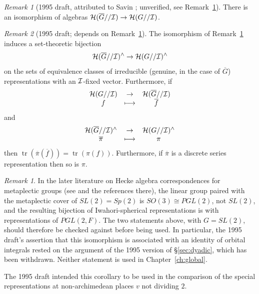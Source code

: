 \documentclass[12pt,letterpaper,openany]{book}
\theoremstyle{plain}
\theoremstyle{definition}
\theoremstyle{remark}
\newtheorem{remark}[theorem]{Remark}
\theoremstyle{remark}
\newtheorem{remyy}{Remark}
\newcommand{\tr}{\operatorname{tr}}
\begin{document}
\begin{remyy}[1995 draft, attributed to Savin \cite{Sav}; unverified, see
Remark~\ref{rem:savin-caveat}]\label{claim:savin} There is an isomorphism
of algebras
${\cal H}(\overline{G}//{\cal I})\rightarrow {\cal H}(G//{\cal I})$.
\end{remyy}

\begin{remyy}[1995 draft; depends on Remark~\ref{claim:savin}]
The isomorphism of Remark~\ref{claim:savin}
induces a set-theoretic bijection
\[
{\cal H}(\overline{G}//{\cal I})^\wedge\rightarrow {\cal H}(G//{\cal I})^\wedge
\]
on the sets of equivalence
classes of irreducible (genuine, in the case of $\overline{G}$)
representations with an ${\cal I}$-fixed vector.
Furthermore, if
\[
\begin{array}{ccc}
{\cal H}(G//{\cal I})&\rightarrow &{\cal H}(\overline{G}//{\cal I})\\
f & \longmapsto & \overline{f}
\end{array}
\]
and
\[
\begin{array}{ccc}
{\cal H}(\overline{G}//{\cal I})^\wedge &\rightarrow &{\cal H}(G//{\cal I})^\wedge\\
\overline{\pi}&\longmapsto &\pi
\end{array}
\]
then $\tr(\overline{\pi}(\overline{f}))=\tr(\pi(f))$.
Furthermore, if $\overline{\pi}$ is a discrete series representation
then so is $\pi$.
\end{remyy}

\begin{remark}\label{rem:savin-caveat}
In the later literature on Hecke algebra correspondences
for metaplectic groups (see \cite{TW} and the references there), the
linear group paired with the metaplectic cover of $SL(2)=Sp(2)$ is
$SO(3)\cong PGL(2)$, not $SL(2)$, and the resulting bijection of
Iwahori-spherical representations is with representations of $PGL(2,F)$.
The two statements above, with $G=SL(2)$, should therefore be
checked against \cite{Sav} before being used. In particular, the 1995
draft's assertion that this isomorphism is associated with an identity
of orbital integrals rested on the argument of the 1995 version of
\S\ref{sec:dyadic}, which has been withdrawn.
Neither statement is used in Chapter~\ref{ch:global}.
\end{remark}

The 1995 draft intended this corollary to be used in the comparison of
the special representations at non-archimedean places $v$ not dividing
$2$.
\end{document}
